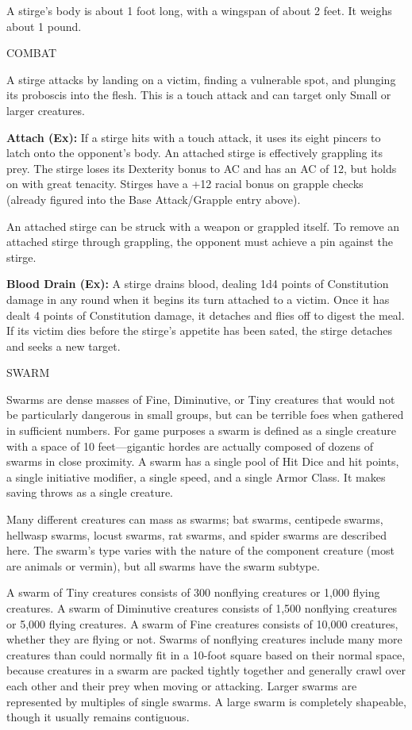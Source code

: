 \documentclass{article}
\begin{document}
A stirge's body is about 1 foot long, with a wingspan of about 2 feet. It weighs 
about 1 pound.

COMBAT

A stirge attacks by landing on a victim, finding a vulnerable spot, and plunging 
its proboscis into the flesh. This is a touch attack and can target only Small 
or larger creatures.

\textbf{Attach (Ex):} If a stirge hits with a touch attack, it uses its eight pincers 
to latch onto the opponent's body. An attached stirge is effectively grappling 
its prey. The stirge loses its Dexterity bonus to AC and has an AC of 12, but holds 
on with great tenacity. Stirges have a +12 racial bonus on grapple checks (already 
figured into the Base Attack/Grapple entry above).

An attached stirge can be struck with a weapon or grappled itself. To remove an 
attached stirge through grappling, the opponent must achieve a pin against the 
stirge.

\textbf{Blood Drain (Ex):} A stirge drains blood, dealing 1d4 points of Constitution 
damage in any round when it begins its turn attached to a victim. Once it has dealt 
4 points of Constitution damage, it detaches and flies off to digest the meal. 
If its victim dies before the stirge's appetite has been sated, the stirge detaches 
and seeks a new target.

\vspace{12pt}
{\LARGE{}SWARM}

Swarms are dense masses of Fine, Diminutive, or Tiny creatures that would not be 
particularly dangerous in small groups, but can be terrible foes when gathered 
in sufficient numbers. For game purposes a swarm is defined as a single creature 
with a space of 10 feet---gigantic hordes are actually composed of dozens of swarms 
in close proximity. A swarm has a single pool of Hit Dice and hit points, a single 
initiative modifier, a single speed, and a single Armor Class. It makes saving 
throws as a single creature.

Many different creatures can mass as swarms; bat swarms, centipede swarms, hellwasp 
swarms, locust swarms, rat swarms, and spider swarms are described here. The swarm's 
type varies with the nature of the component creature (most are animals or vermin), 
but all swarms have the swarm subtype.

A swarm of Tiny creatures consists of 300 nonflying creatures or 1,000 flying creatures. 
A swarm of Diminutive creatures consists of 1,500 nonflying creatures or 5,000 
flying creatures. A swarm of Fine creatures consists of 10,000 creatures, whether 
they are flying or not. Swarms of nonflying creatures include many more creatures 
than could normally fit in a 10-foot square based on their normal space, because 
creatures in a swarm are packed tightly together and generally crawl over each 
other and their prey when moving or attacking. Larger swarms are represented by 
multiples of single swarms. A large swarm is completely shapeable, though it usually 
remains contiguous.
\end{document}
